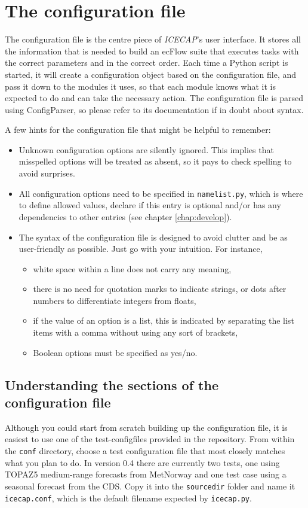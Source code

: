 \documentclass[DIV=10, parskip=full]{scrreprt}
\newcommand{\ice}{\textit{ICECAP}\xspace}
\newcommand{\version}{0.4\xspace}
\begin{document}
\section{The configuration file}\label{chap:config}
The configuration file is the centre piece of {\ice}'s user interface. It stores  all the information that is needed to build an ecFlow suite that executes tasks with the correct parameters and in the correct order. Each time a Python script is started, it will create a configuration object based on the configuration file, and pass it down to the modules it uses, so that each module knows what it is expected to do and can take the necessary action. The configuration file is parsed using ConfigParser, so please refer to its documentation if in doubt about syntax. 

A few hints for the configuration file that might be helpful to remember:
\begin{itemize}
 \item Unknown configuration options are silently ignored. This implies that misspelled options will be treated as absent, so it pays to check spelling to avoid surprises.
 \item All configuration options need to be specified in \texttt{namelist.py}, which is where to define allowed values, declare if this entry is optional and/or has any dependencies to other entries (see chapter \ref{chap:develop}).
 \item The syntax of the configuration file is designed to avoid clutter and be as user-friendly as possible. Just go with your intuition. For instance,
 \begin{itemize}
   \item white space within a line does not carry any meaning,
   \item there is no need for quotation marks to indicate strings, or dots after numbers to differentiate integers from floats,
   \item if the value of an option is a list, this is indicated by separating the list items with a comma without using any sort of brackets,
   \item Boolean options must be specified as yes/no.
 \end{itemize}
\end{itemize}


\subsection{Understanding the sections of the configuration file}
Although you could start from scratch building up the configuration file, it is easiest to use one of the test-configfiles provided in the repository. From within the \texttt{conf} directory, choose a test configuration file that most closely matches what you plan to do. In version \version there are currently two tests, one using TOPAZ5 medium-range forecasts from MetNorway and one test case using a seasonal forecast from the CDS. Copy it into the \texttt{sourcedir} folder and name it \texttt{icecap.conf}, which is the default filename expected by \texttt{icecap.py}. 
\end{document}
